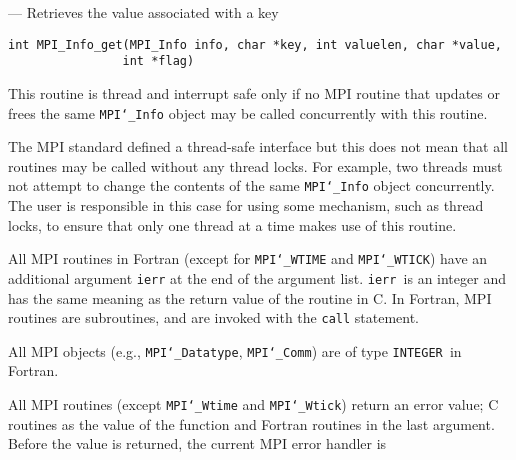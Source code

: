 \startmanpage
{}
--- Retrieves the value associated with a key 
\startvb\begin{verbatim}
int MPI_Info_get(MPI_Info info, char *key, int valuelen, char *value, 
                int *flag)

\end{verbatim}
\endvb

\par
{}
\par
\par
\par
{}
\par
This routine is thread and interrupt safe only if no MPI routine that
updates or frees the same {\tt MPI{\tt \char`\_}Info} object may be called concurrently
with this routine.
\par
The MPI standard defined a thread-safe interface but this does not
mean that all routines may be called without any thread locks.  For
example, two threads must not attempt to change the contents of the
same {\tt MPI{\tt \char`\_}Info} object concurrently.  The user is responsible in this
case for using some mechanism, such as thread locks, to ensure that
only one thread at a time makes use of this routine.
\par
{}
All MPI routines in Fortran (except for {\tt MPI{\tt \char`\_}WTIME} and {\tt MPI{\tt \char`\_}WTICK}) have
an additional argument {\tt ierr} at the end of the argument list.  {\tt ierr
}is an integer and has the same meaning as the return value of the routine
in C.  In Fortran, MPI routines are subroutines, and are invoked with the
{\tt call} statement.
\par
All MPI objects (e.g., {\tt MPI{\tt \char`\_}Datatype}, {\tt MPI{\tt \char`\_}Comm}) are of type {\tt INTEGER
}in Fortran.
\par
{}
\par
All MPI routines (except {\tt MPI{\tt \char`\_}Wtime} and {\tt MPI{\tt \char`\_}Wtick}) return an error value;
C routines as the value of the function and Fortran routines in the last
argument.  Before the value is returned, the current MPI error handler is
